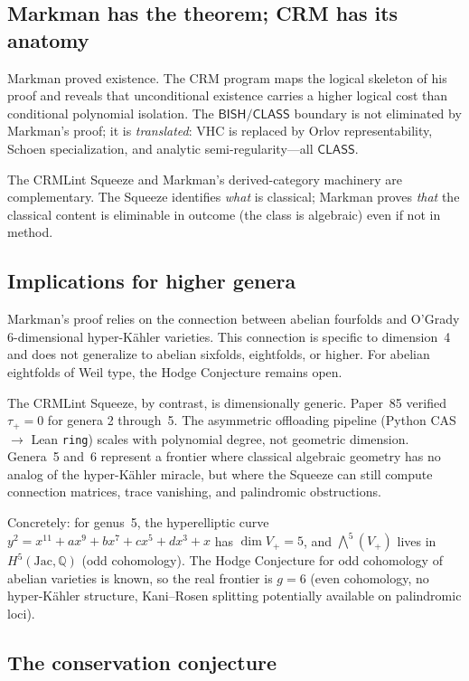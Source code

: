 \documentclass[11pt]{article}
\theoremstyle{plain}
\theoremstyle{definition}
\theoremstyle{remark}
\newcommand{\QQ}{\mathbb{Q}}
\newcommand{\Jac}{\mathrm{Jac}}
\newcommand{\BISH}{\mathsf{BISH}}
\newcommand{\CLASS}{\mathsf{CLASS}}
\begin{document}
\subsection{Markman has the theorem; CRM has its anatomy}

Markman proved existence.  The CRM program maps the logical skeleton
of his proof and reveals that unconditional existence carries a
higher logical cost than conditional polynomial isolation.  The
$\BISH/\CLASS$ boundary is not eliminated by Markman's proof; it is
\emph{translated}: VHC is replaced by Orlov representability,
Schoen specialization, and analytic semi-regularity---all $\CLASS$.

The CRMLint Squeeze and Markman's derived-category machinery are
complementary.  The Squeeze identifies \emph{what} is classical;
Markman proves \emph{that} the classical content is eliminable in
outcome (the class is algebraic) even if not in method.

\subsection{Implications for higher genera}

Markman's proof relies on the connection between abelian fourfolds
and O'Grady 6-dimensional hyper-K\"ahler varieties.  This connection
is specific to dimension~4 and does not generalize to abelian
sixfolds, eightfolds, or higher.  For abelian eightfolds of Weil
type, the Hodge Conjecture remains open.

The CRMLint Squeeze, by contrast, is dimensionally generic.
Paper~85 verified $\tau_+ = 0$ for genera 2 through~5.  The
asymmetric offloading pipeline (Python CAS $\to$ Lean \texttt{ring})
scales with polynomial degree, not geometric dimension.  Genera~5
and~6 represent a frontier where classical algebraic geometry has no
analog of the hyper-K\"ahler miracle, but where the Squeeze can
still compute connection matrices, trace vanishing, and palindromic
obstructions.

Concretely: for genus~5, the hyperelliptic curve
$y^2 = x^{11} + ax^9 + bx^7 + cx^5 + dx^3 + x$ has
$\dim V_+ = 5$, and $\bigwedge^5(V_+)$ lives in $H^5(\Jac, \QQ)$
(odd cohomology).  The Hodge Conjecture for odd cohomology of abelian
varieties is known, so the real frontier is $g = 6$ (even
cohomology, no hyper-K\"ahler structure, Kani--Rosen splitting
potentially available on palindromic loci).

\subsection{The conservation conjecture}
\end{document}
